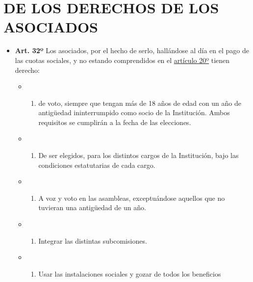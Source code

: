 \documentclass[]{book}
\providecommand{\tightlist}{%
  \setlength{\itemsep}{0pt}\setlength{\parskip}{0pt}}
\begin{document}
\chapter{DE LOS DERECHOS DE LOS ASOCIADOS}\label{cap4}

\begin{itemize}
\tightlist
\item
  \textbf{Art. 32º} Los asociados, por el hecho de serlo, hallándose al
  día en el pago de las cuotas sociales, y no estando comprendidos en el
  \protect\hyperlink{art20}{artículo 20º} tienen derecho:

  \begin{itemize}
  \item
    \begin{enumerate}
    \def\labelenumi{\alph{enumi})}
    \tightlist
    \item
      de voto, siempre que tengan más de 18 años de edad con un año de
      antigüedad ininterrumpido como socio de la Institución. Ambos
      requisitos se cumplirán a la fecha de las elecciones.
    \end{enumerate}
  \item
    \begin{enumerate}
    \def\labelenumi{\alph{enumi})}
    \setcounter{enumi}{1}
    \tightlist
    \item
      De ser elegidos, para los distintos cargos de la Institución, bajo
      las condiciones estatutarias de cada cargo.
    \end{enumerate}
  \item
    \begin{enumerate}
    \def\labelenumi{\alph{enumi})}
    \setcounter{enumi}{2}
    \tightlist
    \item
      A voz y voto en las asambleas, exceptuándose aquellos que no
      tuvieran una antigüedad de un año.
    \end{enumerate}
  \item
    \begin{enumerate}
    \def\labelenumi{\alph{enumi})}
    \setcounter{enumi}{3}
    \tightlist
    \item
      Integrar las distintas subcomisiones.
    \end{enumerate}
  \item
    \begin{enumerate}
    \def\labelenumi{\alph{enumi})}
    \setcounter{enumi}{4}
    \tightlist
    \item
      Usar las instalaciones sociales y gozar de todos los beneficios

\end{enumerate}
\end{itemize}
\end{itemize}
\end{document}
